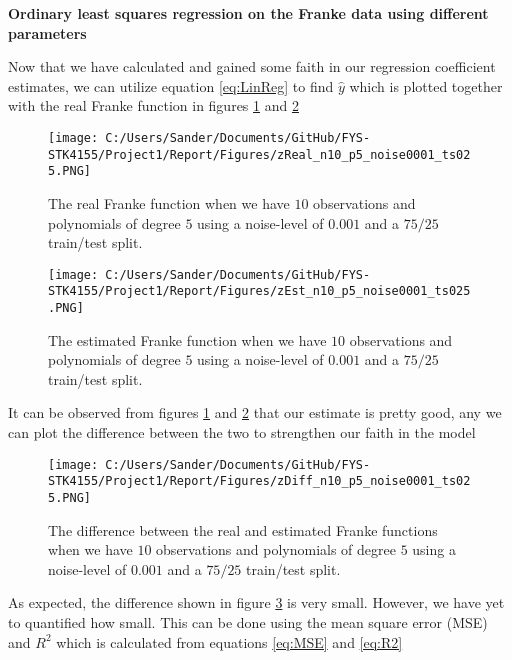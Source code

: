 \documentclass[12pt,a4paper]{article}
\begin{document}
\begin{center}
\large{\textbf{Ordinary least squares regression on the Franke data using different parameters}}
\end{center}

\noindent Now that we have calculated and gained some faith in our regression coefficient estimates, we can utilize equation \ref{eq:LinReg} to find $\hat{y}$ which is plotted together with the real Franke function in figures \ref{fig:FrankeReal1} and \ref{fig:FrankeEst1}

\begin{figure}[H]
\centering
\texttt{[image: C:/Users/Sander/Documents/GitHub/FYS-STK4155/Project1/Report/Figures/zReal\_n10\_p5\_noise0001\_ts025.PNG]}
\caption{\label{fig:FrankeReal1} The real Franke function when we have $10$ observations and polynomials of degree $5$ using a noise-level of $0.001$ and a $75/25$ train/test split.}
\end{figure}

\begin{figure}[H]
\centering
\texttt{[image: C:/Users/Sander/Documents/GitHub/FYS-STK4155/Project1/Report/Figures/zEst\_n10\_p5\_noise0001\_ts025.PNG]}
\caption{\label{fig:FrankeEst1} The estimated Franke function when we have $10$ observations and polynomials of degree $5$ using a noise-level of $0.001$ and a $75/25$ train/test split.}
\end{figure}

\noindent It can be observed from figures \ref{fig:FrankeReal1} and \ref{fig:FrankeEst1} that our estimate is pretty good, any we can plot the difference between the two to strengthen our faith in the model

\begin{figure}[H]
\centering
\texttt{[image: C:/Users/Sander/Documents/GitHub/FYS-STK4155/Project1/Report/Figures/zDiff\_n10\_p5\_noise0001\_ts025.PNG]}
\caption{\label{fig:FrankeDIFF1} The difference between the real and estimated Franke functions when we have $10$ observations and polynomials of degree $5$ using a noise-level of $0.001$ and a $75/25$ train/test split.}
\end{figure}

\noindent As expected, the difference shown in figure \ref{fig:FrankeDIFF1} is very small. However, we have yet to quantified how small. This can be done using the mean square error (MSE) and $R^2$ which is calculated from equations \ref{eq:MSE} and \ref{eq:R2}
\end{document}

